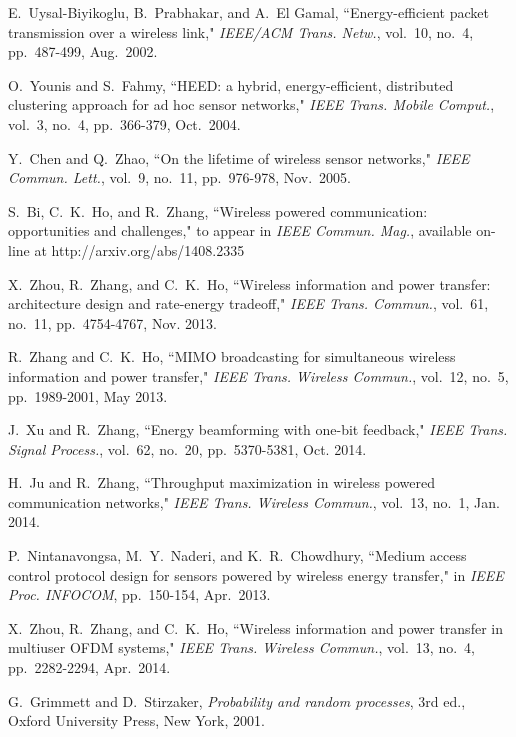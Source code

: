 \documentclass[conference]{IEEEtran}
\begin{document}
\begin{thebibliography}{1}
\small

E.~Uysal-Biyikoglu, B.~Prabhakar, and A.~El Gamal, ``Energy-efficient packet transmission over a wireless link," \emph{IEEE/ACM Trans. Netw.}, vol.~10, no.~4, pp.~487-499, Aug.~2002.

O.~Younis and S.~Fahmy, ``HEED: a hybrid, energy-efficient, distributed clustering approach for ad hoc sensor networks," \emph{IEEE Trans. Mobile Comput.}, vol.~3, no.~4, pp.~366-379, Oct.~2004.

Y.~Chen and Q.~Zhao, ``On the lifetime of wireless sensor networks," \emph{IEEE Commun. Lett.}, vol.~9, no.~11, pp.~976-978, Nov.~2005.

S.~Bi, C.~K.~Ho, and R.~Zhang, ``Wireless powered communication: opportunities and challenges," to appear in \emph{IEEE Commun. Mag.}, available on-line at http://arxiv.org/abs/1408.2335

X.~Zhou, R.~Zhang, and C.~K.~Ho, ``Wireless information and power transfer: architecture design and rate-energy tradeoff," \emph{IEEE Trans. Commun.}, vol.~61, no.~11, pp.~4754-4767, Nov. 2013.

R.~Zhang and C.~K.~Ho, ``MIMO broadcasting for simultaneous wireless information and power transfer," \emph{IEEE Trans. Wireless Commun.}, vol.~12, no.~5, pp.~1989-2001, May 2013.

J.~Xu and R.~Zhang, ``Energy beamforming with one-bit feedback," \emph{IEEE Trans. Signal Process.}, vol.~62, no.~20, pp.~5370-5381, Oct. 2014.

H.~Ju and R.~Zhang, ``Throughput maximization in wireless powered communication networks," \emph{IEEE Trans. Wireless Commun.}, vol.~13, no.~1, Jan. 2014.

P.~Nintanavongsa, M.~Y.~Naderi, and K.~R.~Chowdhury, ``Medium access control protocol design for sensors powered by wireless energy transfer," in \emph{IEEE Proc. INFOCOM}, pp.~150-154, Apr.~2013.

X.~Zhou, R.~Zhang, and C.~K.~Ho, ``Wireless information and power transfer in multiuser OFDM systems," \emph{IEEE Trans. Wireless Commun.}, vol.~13, no.~4, pp.~2282-2294, Apr.~2014.


G.~Grimmett and D.~Stirzaker, \emph{Probability and random processes}, 3rd ed., Oxford University Press, New York, 2001.


\end{thebibliography}
\end{document}
